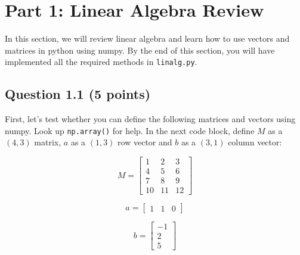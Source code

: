 \documentclass[11pt]{article}
\begin{document}
    \section{Part 1: Linear Algebra
Review}\label{part-1-linear-algebra-review}

In this section, we will review linear algebra and learn how to use
vectors and matrices in python using numpy. By the end of this section,
you will have implemented all the required methods in
\texttt{linalg.py}.

    \subsection{Question 1.1 (5 points)}\label{question-1.1-5-points}

First, let's test whether you can define the following matrices and
vectors using numpy. Look up \texttt{np.array()} for help. In the next
code block, define \(M\) as a \((4, 3)\) matrix, \(a\) as a \((1, 3)\)
row vector and \(b\) as a \((3, 1)\) column vector:

\[M = \begin{bmatrix}
1 & 2 & 3 \\
4 & 5 & 6 \\
7 & 8 & 9 \\
10 & 11 & 12 \end{bmatrix}
\]

\[a = \begin{bmatrix}
1 & 1 & 0
\end{bmatrix}
\]

\[b = \begin{bmatrix}
-1 \\ 2 \\ 5
\end{bmatrix}  
\]
\end{document}
